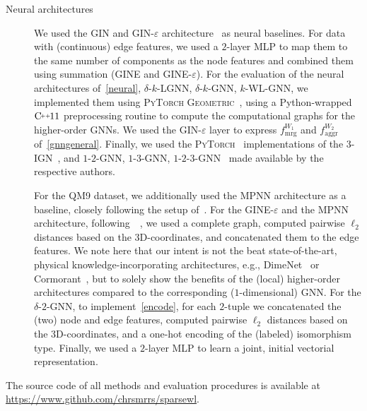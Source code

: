 \documentclass{article}
\theoremstyle{definition}
\newcommand{\CC}[1][]{$\text{C\hspace{-.25ex}}^{_{_{_{++}}}}
	\ifthenelse{\equal{#1}{}}{}{\text{\hspace{-.625ex}#1}}$}
\newcommand{\deltakwln}{$\delta$-$k$-\textsf{GNN}\xspace}
\newcommand{\localkwln}{$\delta$-$k$-\textsf{LGNN}\xspace}
\newcommand{\kwln}{$k$-\textsf{WL-GNN}\xspace}
\newcommand{\gnn}{\textsf{GNN}\xspace}
\newcommand{\mpnn}{\textsf{MPNN}\xspace}
\newcommand{\gin}{\textsf{GIN}\xspace}
\newcommand{\gine}{\textsf{GINE}\xspace}
\newcommand{\gineps}{\textsf{GIN-$\varepsilon$}\xspace}
\newcommand{\gineeps}{\textsf{GINE-$\varepsilon$}\xspace}
\begin{document}
\begin{description}
	\item[Neural architectures] We used the \gin and \gineps architecture~\cite{Xu+2018b} as neural baselines. For data with (continuous) edge features, we used a $2$-layer MLP to map them to the same number of components as the node features and combined them using summation (\gine and \gineeps). For the evaluation of the neural architectures of~\cref{neural}, \localkwln, \deltakwln, \kwln, we implemented them using \textsc{PyTorch Geometric}~\cite{Fey+2019}, using a  Python-wrapped \CC[11] preprocessing routine to compute the computational graphs for the higher-order GNNs. We used the \gineps layer to express $f^{W_1}_{\text{mrg}}$ and $f^{W_2}_{\text{aggr}}$ of~\cref{gnngeneral}. Finally, we used the \textsc{PyTorch}~\cite{Pas+2019} implementations of the $3$-\textsf{IGN}~\cite{Mar+2019}, and $1$-$2$-\gnn, $1$-$3$-\gnn, $1$-$2$-$3$-\gnn~\cite{Mor+2019} made available by the respective authors. 
	
	For the \textsc{QM9} dataset, we additionally used the \mpnn architecture as a baseline, closely following the setup of~\cite{Gil+2017}. For the \gineeps and the \mpnn architecture, following~\citeauthor{Gil+2017}~\cite{Gil+2017}, we used a complete graph, computed pairwise $\ell_2$ distances based on the 3D-coordinates, and concatenated them to the edge features. We note here that our intent is not the beat state-of-the-art, physical knowledge-incorporating architectures, e.g., \textsf{DimeNet}~\cite{Kli+2020} or \textsf{Cormorant}~\cite{And+2019}, but to solely show the benefits of the (local) higher-order architectures compared to the corresponding ($1$-dimensional) GNN. For the $\delta$-$2$-\textsf{GNN}, to implement~\cref{encode}, for each $2$-tuple we concatenated the (two) node and edge features, computed pairwise $\ell_2$ distances based on the 3D-coordinates, and a one-hot encoding of the (labeled) isomorphism type. Finally, we used a $2$-layer MLP to learn a joint, initial vectorial representation.
\end{description}
The source code of all methods and evaluation procedures is available at \url{https://www.github.com/chrsmrrs/sparsewl}.
\end{document}
